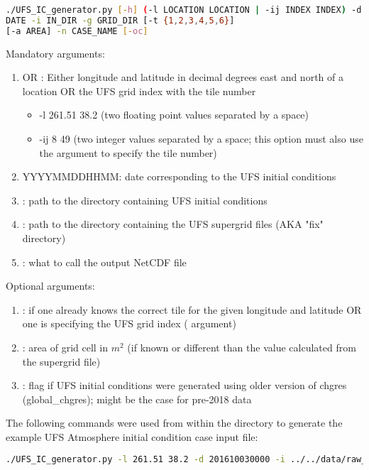 \begin{lstlisting}[language=bash]
./UFS_IC_generator.py [-h] (-l LOCATION LOCATION | -ij INDEX INDEX) -d
DATE -i IN_DIR -g GRID_DIR [-t {1,2,3,4,5,6}]
[-a AREA] -n CASE_NAME [-oc]
\end{lstlisting}

Mandatory arguments:
\begin{enumerate}
\item {} OR :  Either longitude and latitude in decimal degrees east and north of a location OR the UFS grid index with the tile number
	\begin{itemize}
		\item -l 261.51 38.2 (two floating point values separated by a space)
		\item -ij 8 49 (two integer values separated by a space; this option must also use the  argument to specify the tile number)
	\end{itemize}
\item {} YYYYMMDDHHMM: date corresponding to the UFS initial conditions
\item {}: path to the directory containing UFS initial conditions
\item {}: path to the directory containing the UFS supergrid files (AKA "fix" directory)
\item {}: what to call the output NetCDF file
\end{enumerate}

Optional arguments:
\begin{enumerate}
\item {}: if one already knows the correct tile for the given longitude and latitude OR one is specifying the UFS grid index ( argument)
\item {}: area of grid cell in $m^2$ (if known or different than the value calculated from the supergrid file)
\item {}: flag if UFS initial conditions were generated using older version of chgres (global\_chgres); might be the case for pre-2018 data
\end{enumerate}

The following commands were used from within the  directory to generate the example UFS Atmosphere initial condition case input file:
\begin{lstlisting}[language=bash]
./UFS_IC_generator.py -l 261.51 38.2 -d 201610030000 -i ../../data/raw_case_input/FV3_C96_example_ICs -g ../../data/raw_case_input/FV3_C96_example_ICs -n fv3_model_point_noah -oc
\end{lstlisting}


